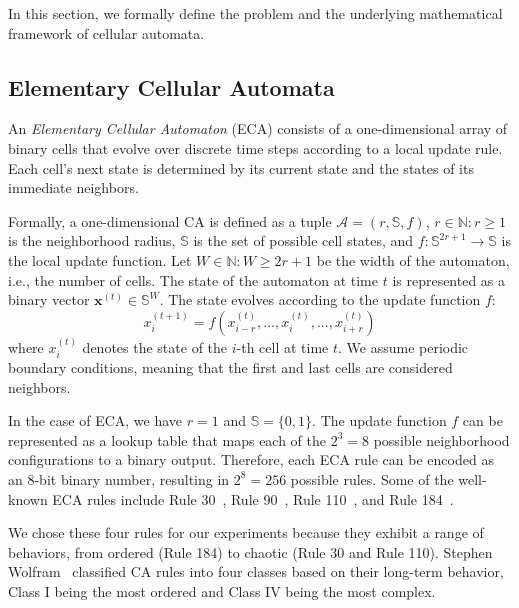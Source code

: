 \documentclass[runningheads]{llncs}
\begin{document}
In this section, we formally define the problem and the underlying mathematical framework of cellular automata.


\subsection{Elementary Cellular Automata}
\label{sec:eca}

An \textit{Elementary Cellular Automaton} (ECA) consists of a one-dimensional array of binary cells that evolve over discrete time steps according to a local update rule. Each cell's next state is determined by its current state and the states of its immediate neighbors.

Formally, a one-dimensional CA is defined as a tuple $\mathcal{A} = (r, \mathbb{S}, f)$, $r \in \mathbb{N} : r \geq 1$ is the neighborhood radius, $\mathbb{S}$ is the set of possible cell states, and $f : \mathbb{S}^{2r+1} \to \mathbb{S}$ is the local update function. Let $W \in \mathbb{N} : W \geq 2r + 1$ be the width of the automaton, i.e., the number of cells. The state of the automaton at time $t$ is represented as a binary vector $\mathbf{x}^{(t)} \in \mathbb{S}^W$. The state evolves according to the update function $f$:
$$ x^{(t+1)}_i = f(x^{(t)}_{i-r}, ...,  x^{(t)}_i, ..., x^{(t)}_{i+r}) $$
where $x^{(t)}_i$ denotes the state of the $i$-th cell at time $t$. We assume periodic boundary conditions, meaning that the first and last cells are considered neighbors.

In the case of ECA, we have $r = 1$ and $\mathbb{S} = \{0, 1\}$. The update function $f$ can be represented as a lookup table that maps each of the $2^{3} = 8$ possible neighborhood configurations to a binary output. Therefore, each ECA rule can be encoded as an 8-bit binary number, resulting in $2^8 = 256$ possible rules. Some of the well-known ECA rules include Rule 30~\cite{rule30}, Rule 90~\cite{rule90}, Rule 110~\cite{rule110}, and Rule 184~\cite{rule184}.

We chose these four rules for our experiments because they exhibit a range of behaviors, from ordered (Rule 184) to chaotic (Rule 30 and Rule 110). Stephen Wolfram~\cite{wolfram} classified CA rules into four classes based on their long-term behavior, Class I being the most ordered and Class IV being the most complex.
\end{document}
